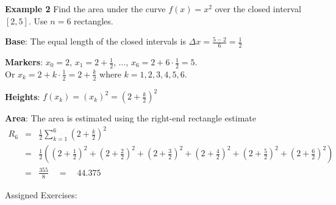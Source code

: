 \documentclass[12pt]{article}
\newcommand{\example}[1]{\noindent\textbf{Example #1\quad}}
\begin{document}
\example{2} Find the area under the curve $f(x) = x^2$ over the closed interval $[2, 5]$.
Use $n = 6$ rectangles.

\textbf{Base}: The equal length of the closed intervals is $\Delta x = \frac{5-2}{6} = \frac{1}{2}$

\textbf{Markers}: $x_0 = 2$, $x_1 = 2 + \frac{1}{2}$, $\ldots$, $x_6 = 2 + 6 \cdot \frac{1}{2} = 5$.\\
Or $x_k = 2 + k \cdot \frac{1}{2} = 2 + \frac{k}{2}$ where $k = 1, 2, 3, 4, 5, 6$.

\textbf{Heights}: $f(x_k) = (x_k)^2 = (2 + \frac{k}{2})^2$

\textbf{Area}: The area is estimated using the right-end rectangle estimate
\begin{eqnarray*}
R_6 &=& \frac{1}{2} \sum_{k=1}^6 \left(2 + \frac{k}{2}\right)^2 \\
&=& \frac{1}{2}\left(\left(2 + \frac{1}{2}\right)^2
+\left(2 + \frac{2}{2}\right)^2
+\left(2 + \frac{3}{2}\right)^2
+\left(2 + \frac{4}{2}\right)^2
+\left(2 + \frac{5}{2}\right)^2
+\left(2 + \frac{6}{2}\right)^2\right) \\
&=& \frac{355}{8} \quad = \quad 44.375
\end{eqnarray*}








\vfill


Assigned Exercises: 
\end{document}
